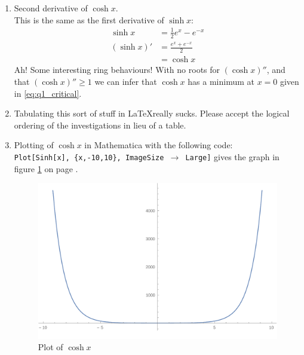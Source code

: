 \begin{enumerate}
\item Second derivative of $\cosh x$. \\
This is the same as the first derivative of $\sinh x$:
\begin{align}
  \sinh x &= \frac{1}{2} e^x - e^{-x} \\
  \left(\sinh x \right)'
    &= \frac{e^x + e^{-x}}{2} \\
    &= \cosh x
\end{align}
Ah! Some interesting ring behaviours! With no roots for $(\cosh x)''$, and that
$(\cosh x)'' \geq 1$ we can infer that $\cosh x$ has a minimum at $x=0$ given
in \eqref{eq:q1_critical}.

\item Tabulating this sort of stuff in \LaTeX really sucks. Please accept the
logical ordering of the investigations in lieu of a table.

\item Plotting of $\cosh x$ in Mathematica with the following code: \\
\texttt{Plot[Sinh[x], \{x,-10,10\}, ImageSize $\to$ Large]} gives the graph in
figure \ref{fig:q1_plot} on page \pageref{fig:q1_plot}.
\begin{figure}[!ht]
  \includegraphics[width=\linewidth]{solutions/q1/plot.pdf}
  \caption{Plot of $\cosh x$}
  \label{fig:q1_plot}
\end{figure}
\end{enumerate}
